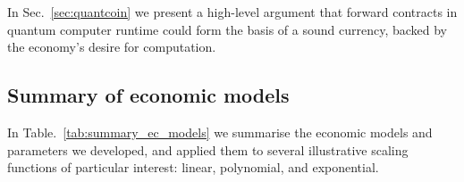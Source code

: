 In Sec.~\ref{sec:quantcoin} we present a high-level argument that forward contracts in quantum computer runtime could form the basis of a sound currency, backed by the economy's desire for computation.

%
%

\subsection{Summary of economic models}

In Table.~\ref{tab:summary_ec_models} we summarise the economic models and parameters we developed, and applied them to several illustrative scaling functions of particular interest: linear, polynomial, and exponential.

\renewcommand{\tablename}{TABLE}
\renewcommand{\arraystretch}{0.5}

